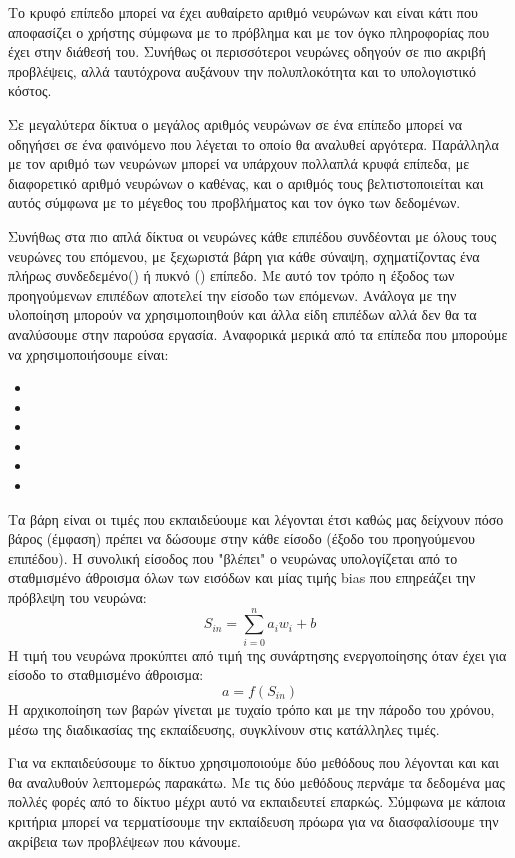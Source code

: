 Το
κρυφό επίπεδο μπορεί να έχει αυθαίρετο αριθμό νευρώνων και είναι κάτι που αποφασίζει ο χρήστης
σύμφωνα με το πρόβλημα και με τον όγκο πληροφορίας που έχει στην διάθεσή του. Συνήθως
οι περισσότεροι νευρώνες οδηγούν σε πιο ακριβή προβλέψεις, αλλά ταυτόχρονα αυξάνουν
την πολυπλοκότητα και το υπολογιστικό κόστος.

Σε μεγαλύτερα δίκτυα ο μεγάλος αριθμός
νευρώνων σε ένα επίπεδο μπορεί να οδηγήσει σε ένα φαινόμενο που λέγεται  το οποίο
θα αναλυθεί αργότερα. Παράλληλα με τον αριθμό των νευρώνων μπορεί να υπάρχουν
πολλαπλά κρυφά επίπεδα, με διαφορετικό αριθμό νευρώνων ο καθένας, και ο αριθμός τους
βελτιστοποιείται και αυτός σύμφωνα με το μέγεθος του προβλήματος και τον όγκο των
δεδομένων.

Συνήθως στα πιο απλά δίκτυα οι νευρώνες κάθε επιπέδου συνδέονται με όλους τους
νευρώνες του επόμενου, με ξεχωριστά βάρη για κάθε σύναψη, σχηματίζοντας ένα πλήρως
συνδεδεμένο() ή πυκνό () επίπεδο. Με αυτό τον τρόπο η έξοδος των
προηγούμενων επιπέδων αποτελεί την είσοδο των επόμενων. Ανάλογα με την υλοποίηση
μπορούν να χρησιμοποιηθούν και άλλα είδη επιπέδων αλλά δεν θα τα αναλύσουμε στην
παρούσα εργασία. Αναφορικά μερικά από τα επίπεδα που μπορούμε να χρησιμοποιήσουμε
είναι:
\begin{itemize}
    \item {}
    \item {}
    \item {}
    \item {}
    \item {}
    \item {}
\end{itemize}

Τα βάρη είναι οι τιμές που εκπαιδεύουμε και λέγονται έτσι καθώς μας δείχνουν πόσο βάρος
(έμφαση) πρέπει να δώσουμε στην κάθε είσοδο (έξοδο του προηγούμενου επιπέδου). Η
συνολική είσοδος που "βλέπει" ο νευρώνας υπολογίζεται από το σταθμισμένο άθροισμα
όλων των εισόδων και μίας τιμής bias που επηρεάζει την πρόβλεψη του νευρώνα:
$$S_{in}=\sum\limits_{i=0}^na_iw_i+b$$
Η τιμή του νευρώνα προκύπτει από τιμή της συνάρτησης ενεργοποίησης όταν έχει για είσοδο
το σταθμισμένο άθροισμα:
$$a=f(S_{in})$$
Η αρχικοποίηση των βαρών γίνεται με τυχαίο τρόπο και με την πάροδο του χρόνου, μέσω της
διαδικασίας της εκπαίδευσης, συγκλίνουν στις κατάλληλες τιμές.

Για να εκπαιδεύσουμε το δίκτυο χρησιμοποιούμε δύο μεθόδους που λέγονται  και
 και θα αναλυθούν λεπτομερώς παρακάτω. Με τις δύο μεθόδους περνάμε
τα δεδομένα μας πολλές φορές από το δίκτυο μέχρι αυτό να εκπαιδευτεί επαρκώς. Σύμφωνα
με κάποια κριτήρια μπορεί να τερματίσουμε την εκπαίδευση πρόωρα για να διασφαλίσουμε
την ακρίβεια των προβλέψεων που κάνουμε.
